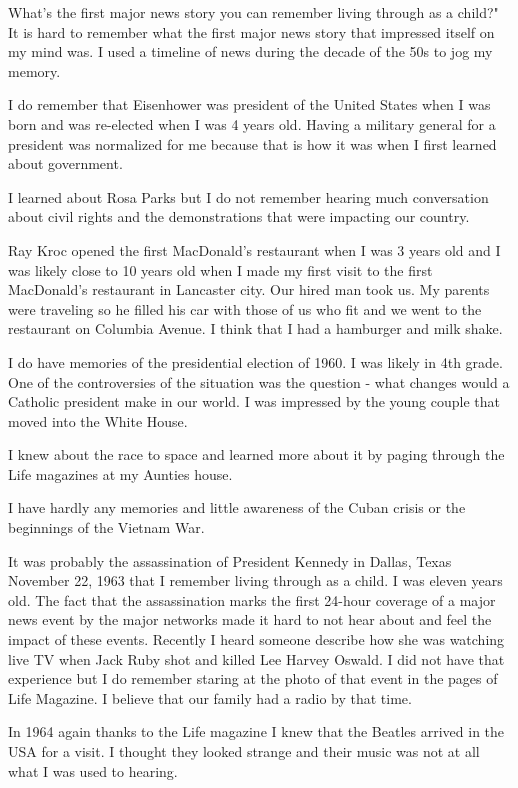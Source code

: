 What's the first major news story you can remember living through as a child?"
It is hard to remember what the first major news story that impressed itself on my mind was.
I used a timeline of news during the decade of the 50s to jog my memory.

I do remember that Eisenhower was president of the United States when I was born and was re-elected when I was 4 years old.
Having a military general for a president was normalized for me because that is how it was when I first learned about government.

I learned about Rosa Parks but I do not remember hearing much conversation about civil rights and the demonstrations that were impacting our country.

Ray Kroc opened the first MacDonald's restaurant when I was 3 years old and I was likely close to 10 years old when I made my first visit to the first MacDonald's restaurant in Lancaster city.
Our hired man took us.
My parents were traveling so he filled his car with those of us who fit and we went to the restaurant on Columbia Avenue.
I think that I had a hamburger and milk shake.

I do have memories of the presidential election of 1960.
I was likely in 4th grade.
One of the controversies of the situation was the question - what changes would a Catholic president make in our world.
I was impressed by the young couple that moved into the White House.

I knew about the race to space and learned more about it by paging through the Life magazines at my Aunties house.

I have hardly any memories and little awareness of the Cuban crisis or the beginnings of the Vietnam War.

It was probably the assassination of President Kennedy in Dallas, Texas November 22, 1963 that I remember living through as a child.
I was eleven years old.
The fact that the assassination marks the first 24-hour coverage of a major news event by the major networks made it hard to not hear about and feel the impact of these events.
Recently I heard someone describe how she was watching live TV when Jack Ruby shot and killed Lee Harvey Oswald.
I did not have that experience but I do remember staring at the photo of that event in the pages of Life Magazine.
I believe that our family had a radio by that time.

In 1964 again thanks to the Life magazine I knew that the Beatles arrived in the USA for a visit.
I thought they looked strange and their music was not at all what I was used to hearing.






